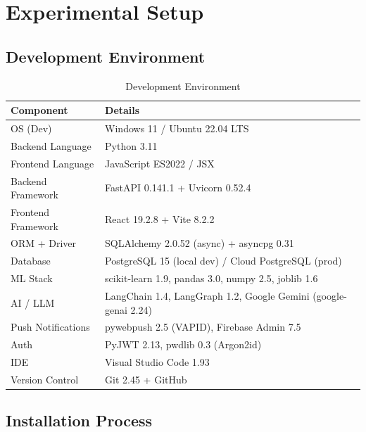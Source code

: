 \chapter{Experimental Setup}

\section{Development Environment}

\begin{table}[h!]
\centering
\caption{Development Environment}
\label{tab:devenv}
\renewcommand{\arraystretch}{1.15}
\begin{tabular}{|p{4cm}|p{9.5cm}|}
\hline
\textbf{Component} & \textbf{Details} \\ \hline
OS (Dev) & Windows 11 / Ubuntu 22.04 LTS \\ \hline
Backend Language & Python 3.11 \\ \hline
Frontend Language & JavaScript ES2022 / JSX \\ \hline
Backend Framework & FastAPI 0.141.1 + Uvicorn 0.52.4 \\ \hline
Frontend Framework & React 19.2.8 + Vite 8.2.2 \\ \hline
ORM + Driver & SQLAlchemy 2.0.52 (async) + asyncpg 0.31 \\ \hline
Database & PostgreSQL 15 (local dev) / Cloud PostgreSQL (prod) \\ \hline
ML Stack & scikit-learn 1.9, pandas 3.0, numpy 2.5, joblib 1.6 \\ \hline
AI / LLM & LangChain 1.4, LangGraph 1.2, Google Gemini (google-genai 2.24) \\ \hline
Push Notifications & pywebpush 2.5 (VAPID), Firebase Admin 7.5 \\ \hline
Auth & PyJWT 2.13, pwdlib 0.3 (Argon2id) \\ \hline
IDE & Visual Studio Code 1.93 \\ \hline
Version Control & Git 2.45 + GitHub \\ \hline
\end{tabular}
\end{table}

\section{Installation Process}

